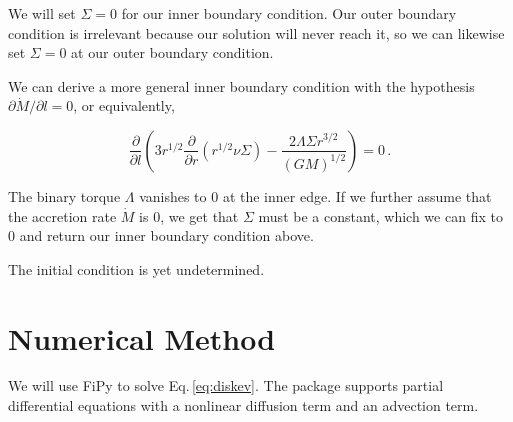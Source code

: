 \documentclass{article}
\begin{document}
We will set $\Sigma = 0$ for our inner boundary condition. Our outer boundary condition is irrelevant because our solution will never reach it, so we can likewise set $\Sigma = 0$ at our outer boundary condition. 

We can derive a more general inner boundary condition with the hypothesis $\partial \dot{M}/ \partial l = 0$, or equivalently,

\begin{equation}
\frac{\partial}{\partial l} \left(3 r^{1/2} \frac{\partial}{\partial r} \left(r^{1/2} \nu \Sigma\right) - \frac{2 \Lambda \Sigma r^{3/2}}{(G M)^{1/2}}\right)= 0\,.
\end{equation}

The binary torque $\Lambda$ vanishes to 0 at the inner edge. If we further assume that the accretion rate $\dot{M}$ is 0, we get that $\Sigma$ must be a constant, which we can fix to 0 and return our inner boundary condition above.

The initial condition is yet undetermined.

\section{Numerical Method}

We will use FiPy to solve Eq.\,\ref{eq:diskev}. The package supports partial differential equations with a nonlinear diffusion term and an advection term.
\end{document}
